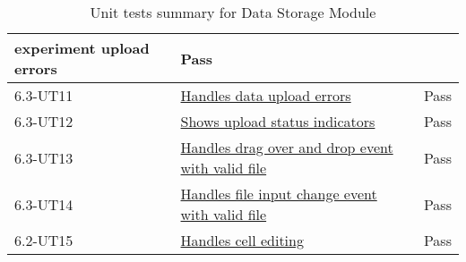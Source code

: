 \documentclass[12pt, titlepage]{article}
\begin{document}
\begin{table}[H]
\begin{tabular}{|l|l|l|}
{    experiment upload errors} & Pass \\
    \hline
    6.3-UT11 &
    \href{https://github.com/SumanyaG/Alkalytics/blob/main/src/backend/test/migrationServiceTest.py}{Handles
    data upload errors} & Pass \\
    \hline
    6.3-UT12 &
    \href{https://github.com/SumanyaG/Alkalytics/blob/main/src/frontend/test/hooks/UploadArea.test.tsxy}{Shows
    upload status indicators} & Pass \\
    \hline
    6.3-UT13 &
    \href{https://github.com/SumanyaG/Alkalytics/blob/main/src/frontend/test/hooks/UploadArea.test.tsx}{Handles
    drag over and drop event with valid file} & Pass \\
    \hline
    6.3-UT14 &
    \href{https://github.com/SumanyaG/Alkalytics/blob/main/src/frontend/test/hooks/UploadArea.test.tsx}{Handles
    file input change event with valid file} & Pass \\
    \hline
    6.2-UT15 &
    \href{https://github.com/SumanyaG/Alkalytics/blob/main/src/frontend/test/hooks/TableBody.test.tsx}{Handles
    cell editing} & Pass \\
    \hline
  \end{tabular}
  \caption{Unit tests summary for Data Storage Module}
  \label{UT:DataStorage}
\end{table}


\newpage
\end{document}
